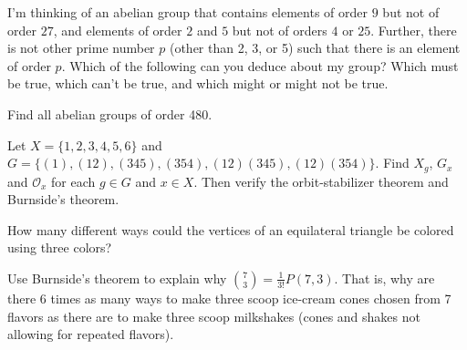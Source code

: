 \documentclass[12pt]{exam}
\def\Z{\mathbb Z}
\begin{document}
\begin{questions}
  \clearpage
  
  
  \question I'm thinking of an abelian group that contains elements of order $9$ but not of order $27$, and elements of order $2$ and $5$ but not of orders $4$ or $25$.  Further, there is not other prime number $p$ (other than 2, 3, or 5) such that there is an element of order $p$. Which of the following can you deduce about my group?  Which must be true, which can't be true, and which might or might not be true.
  
  \clearpage
  
  \question Find all abelian groups of order 480.
  
  \clearpage
  
  
  
  
  \question Let $X = \{1,2,3,4,5,6\}$ and $G = \{(1), (12), (345), (354), (12)(345), (12)(354)\}$.  Find $X_g$, $G_x$ and $\mathcal O_x$ for each $g \in G$ and $x \in X$.  Then verify the orbit-stabilizer theorem and Burnside's theorem.
  
  \clearpage
  
  \question How many different ways could the vertices of an equilateral triangle be colored using three colors?
  
  \clearpage
  
  
  \question Use Burnside's theorem to explain why $\binom{7}{3} = \frac{1}{3!}P(7,3)$.  That is, why are there 6 times as many ways to make three scoop ice-cream cones chosen from 7 flavors as there are to make three scoop milkshakes (cones and shakes not allowing for repeated flavors).
  
  \clearpage
  \end{questions}
\end{document}
